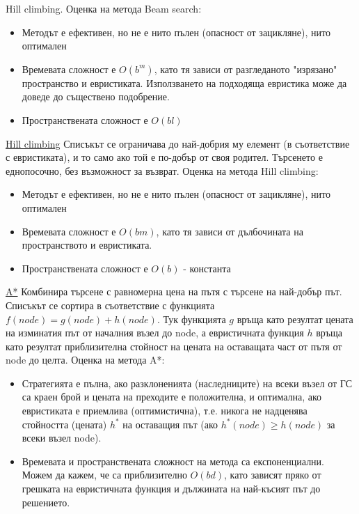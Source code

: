 \documentclass{article}
\begin{document}
Hill climbing. \newline
Оценка на метода Beam search:
\begin{itemize}
    \item Методът е ефективен, но не е нито пълен (опасност от зацикляне), нито оптимален
    \item Времевата сложност е $O(b^m)$, като тя зависи от разгледаното "изрязано" пространство и евристиката. Използването на
    подходяща евристика може да доведе до съществено подобрение.
    \item Пространствената сложност е $O(bl)$
\end{itemize}
\underline{Hill climbing} \newline\newline
Списъкът се ограничава до най-добрия му елемент (в съответствие с евристиката), и то само ако той е по-добър от своя родител.
Търсенето е еднопосочно, без възможност за възврат. \newline
Оценка на метода Hill climbing:
\begin{itemize}
    \item Методът е ефективен, но не е нито пълен (опасност от зацикляне), нито оптимален
    \item Времевата сложност е $O(bm)$, като тя зависи от дълбочината на пространството и евристиката.
    \item Пространствената сложност е $O(b)$ - константа
\end{itemize}
\underline{A*} \newline\newline
Комбинира търсене с равномерна цена на пътя с търсене на най-добър път. Списъкът се сортира в съответствие с функцията
$f(node) = g(node) + h(node)$. Тук функцията $g$ връща като резултат цената на изминатия път от началния възел до node, а
евристичната функция $h$ връща като резултат приблизителна стойност на цената на оставащата част от пътя от node до целта. \newline\newline
Оценка на метода A*:
\begin{itemize}
    \item Стратегията е пълна, ако разклоненията (наследниците) на всеки възел от ГС са краен брой и цената на преходите е
    положителна, и оптимална, ако евристиката е приемлива (оптимистична), т.е. никога не надценява стойността (цената) $h^*$ на
    оставащия път (ако $h^*(node) \ge h(node)$ за всеки възел node).
    \item Времевата и пространствената сложност на метода са експоненциални. Можем да кажем, че са приблизително $O(bd)$, като
    зависят пряко от грешката на евристичната функция и дължината на най-късият път до решението.
\end{itemize}
\end{document}
